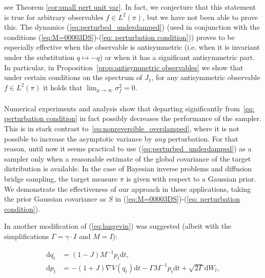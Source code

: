 see Theorem \ref{cor:small pert unit var}. 
In fact, we conjecture that this statement is true for arbitrary observables
$f\in L^{2}(\pi)$, but we have not been able to prove this. The dynamics (\ref{eq:perturbed_underdamped})
(used in conjunction with the conditions (\ref{eq:M=00003DS})-(\ref{eq: perturbation condition}))
proves to be especially effective when the observable is antisymmetric
(i.e. when it is invariant under the substitution $q\mapsto-q$) or when it
has a significant antisymmetric part. In particular, in Proposition~\ref{prop:antisymmetric observables} we show that under certain conditions on the spectrum of $J_1$, for any antisymmetric observable $f\in L^{2}(\pi)$ it holds that  $\lim_{\mu\rightarrow\infty}\sigma_{f}^{2}=0$.
\\\\
Numerical experiments and analysis show that departing significantly
from~\ref{eq: perturbation condition} in fact possibly decreases
the performance of the sampler. This is in stark contrast to~\eqref{eq:nonreversible_overdamped}, where it is not possible to increase the asymptotic variance by \emph{any} perturbation.  For that reason, until now it seems practical to use (\ref{eq:perturbed_underdamped})  as a sampler only when a reasonable estimate of the global covariance of the target distribution is available. In the case of Bayesian inverse problems and diffusion bridge sampling, the target measure $\pi$ is given with respect to a Gaussian prior. We demonstrate the effectiveness of our approach in these applications, taking the prior Gaussian covariance as $S$ in (\ref{eq:M=00003DS})-(\ref{eq: perturbation condition}).
\begin{remark}
	In \cite[Rem. 3]{LelievreNierPavliotis2013} another modification of (\ref{eq:langevin})
	was suggested (albeit with the simplifications $\Gamma=\gamma\cdot I$
	and $M=I$):
\end{remark}
\begin{align}
\mathrm{d}q_{t} & =(1-J)M^{-1}p_{t}\mathrm{d}t ,\nonumber \\
\mathrm{d}p_{t} & =-(1+J)\nabla V(q_{t})\mathrm{d}t-\Gamma M^{-1}p_{t}\mathrm{d}t+\sqrt{2\Gamma}\mathrm{d}W_{t},\label{eq: JJ perturbation}
\end{align}
